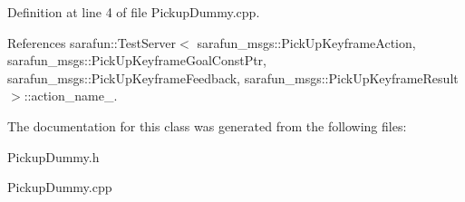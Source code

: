 Definition at line 4 of file Pickup\-Dummy.\-cpp.



References sarafun\-::\-Test\-Server$<$ sarafun\-\_\-msgs\-::\-Pick\-Up\-Keyframe\-Action, sarafun\-\_\-msgs\-::\-Pick\-Up\-Keyframe\-Goal\-Const\-Ptr, sarafun\-\_\-msgs\-::\-Pick\-Up\-Keyframe\-Feedback, sarafun\-\_\-msgs\-::\-Pick\-Up\-Keyframe\-Result $>$\-::action\-\_\-name\-\_\-.



The documentation for this class was generated from the following files\-:\begin{DoxyCompactItemize}
\item 
Pickup\-Dummy.\-h\item 
Pickup\-Dummy.\-cpp\end{DoxyCompactItemize}
